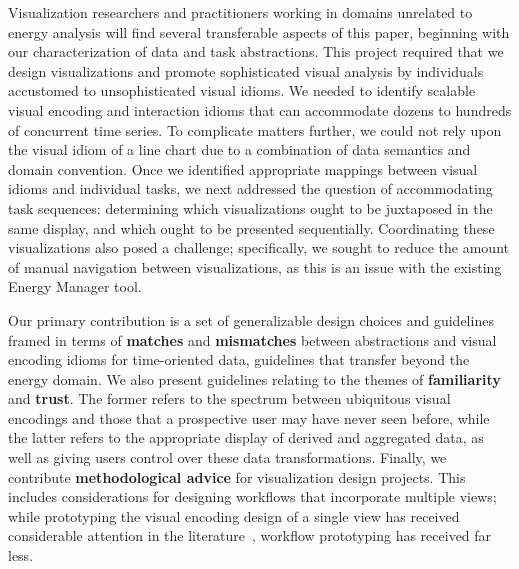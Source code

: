 \documentclass[journal]{vgtc}                %
\newcommand{\bstart}[1]{\vspace{1mm} \noindent{\textbf{#1:}}}
\begin{document}
Visualization researchers and practitioners working in domains unrelated to energy analysis will find several transferable aspects of this paper, beginning with our characterization of data and task abstractions.
This project required that we design visualizations and promote sophisticated visual analysis by individuals accustomed to unsophisticated visual idioms.
We needed to identify scalable visual encoding and interaction idioms that can accommodate dozens to hundreds of concurrent time series.
To complicate matters further, we could not rely upon the visual idiom of a line chart due to a combination of data semantics and domain convention.
Once we identified appropriate mappings between visual idioms and individual tasks, we next addressed the question of accommodating task sequences: determining which visualizations ought to be juxtaposed in the same display, and which ought to be presented sequentially.
Coordinating these visualizations also posed a challenge; specifically, we sought to reduce the amount of manual navigation between visualizations, as this is an issue with the existing Energy Manager tool.

\bstart{Contributions} Our primary contribution is a set of generalizable design choices and guidelines framed in terms of {\bf matches} and {\bf mismatches} between abstractions and visual encoding idioms for time-oriented data, guidelines that transfer beyond the energy domain.
We also present guidelines relating to the themes of {\bf familiarity} and {\bf trust}.
The former refers to the spectrum between ubiquitous visual encodings and those that a prospective user may have never seen before, while the latter refers to the appropriate display of derived and aggregated data, as well as giving users control over these data transformations.
Finally, we contribute {\bf methodological advice} for visualization design projects.
This includes considerations for designing workflows that incorporate multiple views;
while prototyping the visual encoding design of a single view has received considerable attention in the literature~\cite{Lloyd2011}, workflow prototyping has received far less. 
\end{document}
